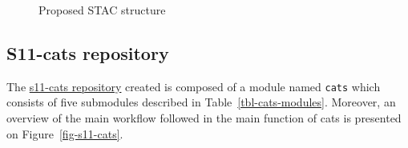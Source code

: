 \documentclass[
  oneside,
  open=any]{scrbook}
\begin{document}
\begin{figure}[H]


\caption{\label{fig-stac-str}Proposed STAC structure}

\end{figure}%

\subsection{S11-cats repository}\label{s11-cats-repository}

The \href{https://gitlab.com/satelligence/s11-cats}{s11-cats repository}
created is composed of a module named \texttt{cats} which consists of
five submodules described in Table~\ref{tbl-cats-modules}. Moreover, an
overview of the main workflow followed in the main function of cats is
presented on Figure~\ref{fig-s11-cats}.
\end{document}

